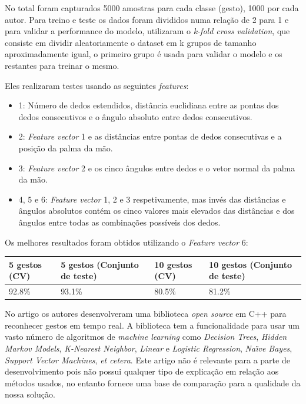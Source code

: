 \documentclass{TTUPhD}
\begin{document}
No total foram capturados 5000 amostras para cada classe (gesto), 1000 por cada autor.
Para treino e teste os dados foram divididos numa relação de 2 para 1 e para validar a performance do modelo,
utilizaram o \textit{k-fold cross validation}, que consiste em dividir aleatoriamente o dataset em k grupos
de tamanho aproximadamente igual, o primeiro grupo é usada para validar o modelo e os restantes para treinar o mesmo.

Eles realizaram testes usando as seguintes \textit{features}:
\begin{itemize}
    \item {} 1: Número de dedos estendidos, distância euclidiana entre as pontas dos dedos consecutivos e o ângulo absoluto entre dedos consecutivos.
    \item {} 2: \textit{Feature vector} 1 e as distâncias entre pontas de dedos consecutivas e a posição da palma da mão.
    \item {} 3: \textit{Feature vector} 2 e os cinco ângulos entre dedos e o vetor normal da palma da mão.
    \item {} 4, 5 e 6: \textit{Feature vector} 1, 2 e 3 respetivamente, mas invés das distâncias e ângulos absolutos contém os cinco valores
                  mais elevados das distâncias e dos ângulos entre todas as combinações possíveis dos dedos.
\end{itemize}

Os melhores resultados foram obtidos utilizando o \textit{Feature vector} 6:
\begin{center}
    \begin{tabular}{|p{2.1cm}|p{2.7cm}|p{2.3cm}|p{2.8cm}|}
        \hline
        5 gestos (CV) & 5 gestos (Conjunto de teste) & 10 gestos (CV) & 10 gestos (Conjunto de teste) \\
        \hline
        \hline
        92.8\% & 93.1\% & 80.5\% & 81.2\% \\
        \hline
    \end{tabular}
\end{center}

No artigo \cite{mit} os autores desenvolveram uma biblioteca \textit{open source} em C++ para reconhecer gestos em tempo real.
A biblioteca tem a funcionalidade para usar um vasto número de algoritmos de \textit{machine learning} como \textit{Decision Trees},
\textit{Hidden Markov Models}, \textit{K-Nearest Neighbor}, \textit{Linear} e \textit{Logistic Regression}, \textit{Naı̈ve Bayes},
\textit{Support Vector Machines}, \textit{et cetera}.
Este artigo não é relevante para a parte de desenvolvimento pois não possui qualquer tipo de explicação em relação aos métodos usados,
no entanto fornece uma base de comparação para a qualidade da nossa solução.
\end{document}
